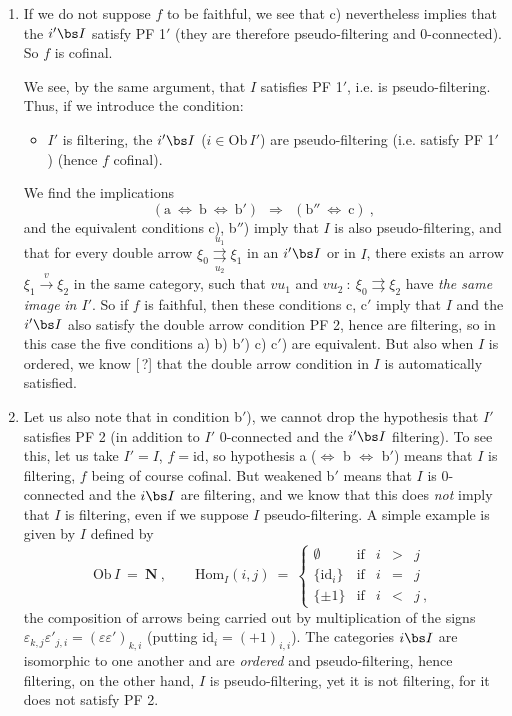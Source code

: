 \begin{enumerate}[label=\arabic*$^\circ$)]
\item If we do not suppose $f$ to be faithful, we see that c) nevertheless implies that the $i'\bs I$ satisfy PF 1$'$ (they are therefore pseudo-filtering and 0-connected). So $f$ is cofinal.

We see, by the same argument, that $I$ satisfies PF 1$'$, i.e. is pseudo-filtering. Thus, if we introduce the condition:
\begin{itemize}[label=]
\item $I'$ is filtering, the $i'\bs I$ ($i \in \mathrm{Ob}\, I'$) are pseudo-filtering (i.e. satisfy PF 1$'$) (hence $f$ cofinal).
\end{itemize}
We find the implications
\[
(\text{a} \ \Longleftrightarrow \ \text{b} \ \Longleftrightarrow \ \text{b}') \ \ \Longrightarrow \ \ (\text{b}'' \ \Longleftrightarrow \ \text{c}) \ ,
\]
and the equivalent conditions c), b$''$) imply that $I$ is also pseudo-filtering, and that for every double arrow $\xi_0 \overset{u_1}{\underset{u_2}{\rightrightarrows}} \xi_1$ in an $i'\bs I$ or in $I$, there exists an arrow $\xi_1 \xrightarrow{v} \xi_2$ in the same category, such that $vu_1$ and $vu_2 \ : \ \xi_0 \rightrightarrows \xi_2$ have \textit{the same image}
\textit{in $I'$}. So if $f$ is faithful, then these conditions c, c$'$ imply that $I$ and the $i'\bs I$ also satisfy the double arrow condition PF 2, hence are filtering, so in this case the five conditions a) b) b$'$) c) c$'$) are equivalent. But also when $I$ is ordered, we know [\,?] that the double arrow condition in $I$ is automatically satisfied.

\item {}Let us also note that in condition b$'$), we cannot drop the hypothesis that $I'$ satisfies PF 2 (in addition to $I'$ 0-connected and the $i'\bs I$ filtering). To see this, let us take $I' = I$, $f = \mathrm{id}$, so hypothesis a ($\Longleftrightarrow$ b $\Longleftrightarrow$ b$'$) means that $I$ is filtering, $f$ being of course cofinal. But weakened b$'$ means that $I$ is 0-connected and the $i\bs I$ are filtering, and we know that this does \textit{not} imply that $I$ is filtering, even if we suppose $I$ pseudo-filtering. A simple example is given by $I$ defined by
\[
\mathrm{Ob}\, I \ = \ \mathbf{N} \ , \qquad \mathrm{Hom}_I(i,j) \ = \ \left\{
\begin{array}{rcccc}
\emptyset & \text{if} & i & > & j \\[1ex]
\{\mathrm{id}_i\} & \text{if} & i & = & j \\[1ex]
\{\pm 1\} & \text{if} & i & < & j \ ,
\end{array}
\right.
\]
the composition of arrows being carried out by multiplication of the signs $\varepsilon_{k,j}\varepsilon'_{j,i} = (\varepsilon\varepsilon')_{k,i}$ (putting $\mathrm{id}_i = (+1)_{i,i}$). The categories $i\bs I$ are isomorphic to one another and are \textit{ordered} and pseudo-filtering, hence filtering, on the other hand, $I$ is pseudo-filtering, yet it is not filtering, for it does not satisfy PF 2.


\end{enumerate}
